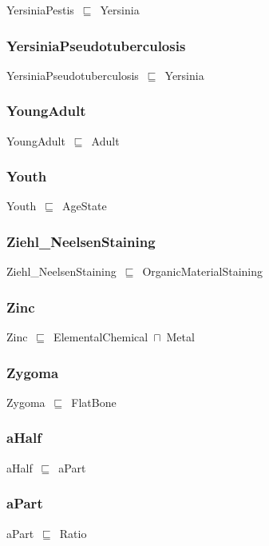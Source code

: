 \documentclass{article}
\begin{document}
YersiniaPestis~\ensuremath{\sqsubseteq}~Yersinia~

\subsubsection*{YersiniaPseudotuberculosis}

YersiniaPseudotuberculosis~\ensuremath{\sqsubseteq}~Yersinia~

\subsubsection*{YoungAdult}

YoungAdult~\ensuremath{\sqsubseteq}~Adult~

\subsubsection*{Youth}

Youth~\ensuremath{\sqsubseteq}~AgeState~

\subsubsection*{Ziehl_NeelsenStaining}

Ziehl\_NeelsenStaining~\ensuremath{\sqsubseteq}~OrganicMaterialStaining~

\subsubsection*{Zinc}

Zinc~\ensuremath{\sqsubseteq}~ElementalChemical~\ensuremath{\sqcap}~Metal~

\subsubsection*{Zygoma}

Zygoma~\ensuremath{\sqsubseteq}~FlatBone~

\subsubsection*{aHalf}

aHalf~\ensuremath{\sqsubseteq}~aPart~

\subsubsection*{aPart}

aPart~\ensuremath{\sqsubseteq}~Ratio~
\end{document}
